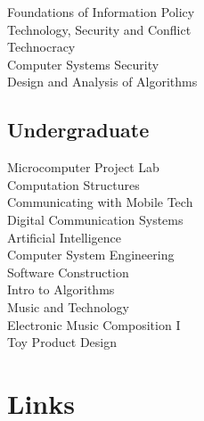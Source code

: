 \documentclass[letterpaper]{deedy-resume} %
\begin{document}
\begin{minipage}[t]{0.33\textwidth}
Foundations of Information Policy \\  %
Technology, Security and Conflict \\  %
Technocracy \\                        %
Computer Systems Security \\          %
Design and Analysis of Algorithms \\  %

\sectionspace %


\subsection{Undergraduate}

Microcomputer Project Lab \\          %
Computation Structures \\             %
Communicating with Mobile Tech \\     %
Digital Communication Systems \\      %
Artificial Intelligence \\            %
Computer System Engineering \\        %
Software Construction \\              %
Intro to Algorithms \\                %
Music and Technology \\               %
Electronic Music Composition I \\     %
Toy Product Design                    %

\sectionspace %


\section{Links}


\end{minipage}
\end{document}
